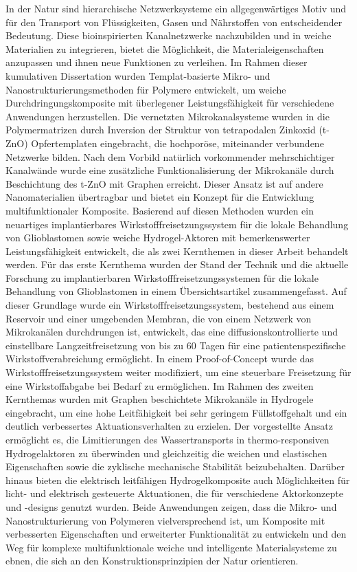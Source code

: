 In der Natur sind hierarchische Netzwerksysteme ein allgegenwärtiges Motiv und für den Transport von Flüssigkeiten, Gasen und Nährstoffen von entscheidender Bedeutung. Diese bioinspirierten Kanalnetzwerke nachzubilden und in weiche Materialien zu integrieren, bietet die Möglichkeit, die Materialeigenschaften anzupassen und ihnen neue Funktionen zu verleihen. Im Rahmen dieser kumulativen Dissertation wurden Templat-basierte Mikro- und Nanostrukturierungsmethoden für Polymere entwickelt, um weiche Durchdringungskomposite mit überlegener Leistungsfähigkeit für verschiedene Anwendungen herzustellen. Die vernetzten Mikrokanalsysteme wurden in die Polymermatrizen durch Inversion der Struktur von tetrapodalen Zinkoxid (t-ZnO) Opfertemplaten eingebracht, die hochporöse, miteinander verbundene Netzwerke bilden.
Nach dem Vorbild natürlich vorkommender mehrschichtiger Kanalwände wurde eine zusätzliche Funktionalisierung der Mikrokanäle durch Beschichtung des t-ZnO mit Graphen erreicht. Dieser Ansatz ist auf andere Nanomaterialien übertragbar und bietet ein Konzept für die Entwicklung multifunktionaler Komposite. Basierend auf diesen Methoden wurden ein neuartiges implantierbares Wirkstofffreisetzungssystem für die lokale Behandlung von Glioblastomen sowie weiche Hydrogel-Aktoren mit bemerkenswerter Leistungsfähigkeit entwickelt, die als zwei Kernthemen in dieser Arbeit behandelt werden. Für das erste Kernthema wurden der Stand der Technik und die aktuelle Forschung zu implantierbaren Wirkstofffreisetzungssystemen für die lokale Behandlung von Glioblastomen in einem Übersichtsartikel zusammengefasst. Auf dieser Grundlage wurde ein Wirkstofffreisetzungssystem, bestehend aus einem Reservoir und einer umgebenden Membran, die von einem Netzwerk von Mikrokanälen durchdrungen ist, entwickelt, das eine diffusionskontrollierte und einstellbare Langzeitfreisetzung von bis zu 60 Tagen für eine patientenspezifische Wirkstoffverabreichung ermöglicht. In einem Proof-of-Concept wurde das Wirkstofffreisetzungssystem weiter modifiziert, um eine steuerbare Freisetzung für eine Wirkstoffabgabe bei Bedarf zu ermöglichen. Im Rahmen des zweiten Kernthemas wurden mit Graphen beschichtete Mikrokanäle in Hydrogele eingebracht, um eine hohe Leitfähigkeit bei sehr geringem Füllstoffgehalt und ein deutlich verbessertes Aktuationsverhalten zu erzielen. Der vorgestellte Ansatz ermöglicht es, die Limitierungen des Wassertransports in thermo-responsiven Hydrogelaktoren zu überwinden und gleichzeitig die weichen und elastischen Eigenschaften sowie die zyklische mechanische Stabilität beizubehalten. Darüber hinaus bieten die elektrisch leitfähigen Hydrogelkomposite auch Möglichkeiten für licht- und elektrisch gesteuerte Aktuationen, die für verschiedene Aktorkonzepte und -designs genutzt wurden. Beide Anwendungen zeigen, dass die Mikro- und Nanostrukturierung von Polymeren vielversprechend ist, um Komposite mit verbesserten Eigenschaften und erweiterter Funktionalität zu entwickeln und den Weg für komplexe multifunktionale weiche und intelligente Materialsysteme zu ebnen, die sich an den Konstruktionsprinzipien der Natur orientieren.